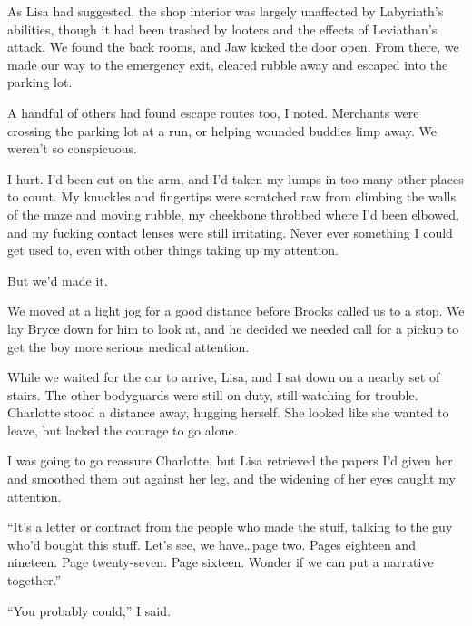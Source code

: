 As Lisa had suggested, the shop interior was largely unaffected by Labyrinth's abilities, though it had been trashed by looters and the effects of Leviathan's attack.  We found the back rooms, and Jaw kicked the door open.  From there, we made our way to the emergency exit, cleared rubble away and escaped into the parking lot.



A handful of others had found escape routes too, I noted.  Merchants were crossing the parking lot at a run, or helping wounded buddies limp away.  We weren't so conspicuous.



I hurt.  I'd been cut on the arm, and I'd taken my lumps in too many other places to count.  My knuckles and fingertips were scratched raw from climbing the walls of the maze and moving rubble, my cheekbone throbbed where I'd been elbowed, and my fucking contact lenses were still irritating.  Never ever something I could get used to, even with other things taking up my attention.



But we'd made it.



We moved at a light jog for a good distance before Brooks called us to a stop.  We lay Bryce down for him to look at, and he decided we needed call for a pickup to get the boy more serious medical attention.



While we waited for the car to arrive, Lisa, and I sat down on a nearby set of stairs.  The other bodyguards were still on duty, still watching for trouble.  Charlotte stood a distance away, hugging herself.  She looked like she wanted to leave, but lacked the courage to go alone.



I was going to go reassure Charlotte, but Lisa retrieved the papers I'd given her and smoothed them out against her leg, and the widening of her eyes caught my attention.



``It's a letter or contract from the people who made the stuff, talking to the guy who'd bought this stuff.  Let's see, we have\ldots page two.  Pages eighteen and nineteen.  Page twenty-seven.  Page sixteen.  Wonder if we can put a narrative together.''



``You probably could,'' I said.




